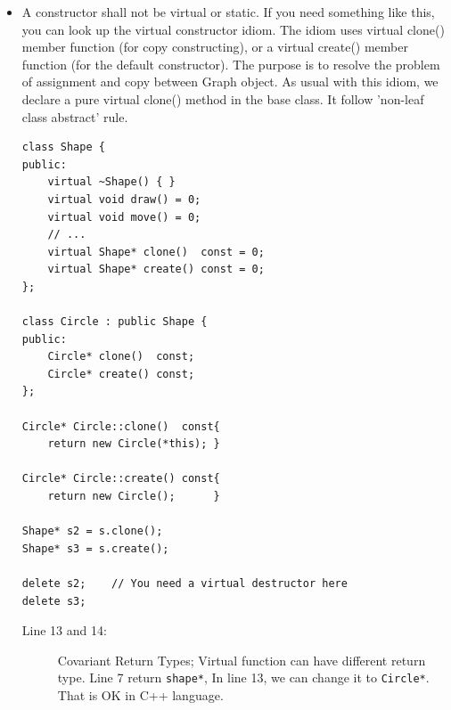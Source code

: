 \documentclass[a4paper,11pt,twoside]{book}
\begin{document}
\begin{itemize}
	\item A constructor shall not be virtual or static. If you need something like this, you can look up the virtual constructor idiom. The idiom uses virtual clone() member function (for copy constructing), or a virtual create() member function (for the default constructor). The purpose is to resolve the problem of assignment and copy between Graph object. As usual with this idiom, we declare a pure virtual clone() method in the base class. It follow 'non-leaf class abstract' rule.
	
\begin{lstlisting}
class Shape {
public:
	virtual ~Shape() { }                 
	virtual void draw() = 0;           
	virtual void move() = 0;
	// ...
	virtual Shape* clone()  const = 0;   
	virtual Shape* create() const = 0; 
};
	
class Circle : public Shape {
public:
	Circle* clone()  const;  
	Circle* create() const;   
};

Circle* Circle::clone()  const{
	return new Circle(*this); }
	
Circle* Circle::create() const{
	return new Circle();      }
	
Shape* s2 = s.clone();
Shape* s3 = s.create();
	
delete s2;    // You need a virtual destructor here
delete s3;
\end{lstlisting}
	\begin{description}
		\item[Line 13 and 14:] Covariant Return Types; Virtual function can have different return type. Line 7 return \texttt{shape*}, In line 13, we can change it to \texttt{Circle*}. That is OK in C++ language.
	\end{description}


\end{itemize}


	
\end{document}
